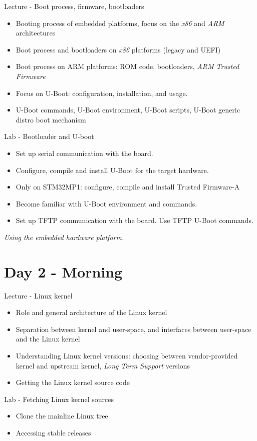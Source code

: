 \documentclass[a4paper,12pt,obeyspaces,spaces,hyphens]{article}
\begin{document}
\feagendatwocolumn
{Lecture - Boot process, firmware, bootloaders}
{
  \begin{itemize}
  \item Booting process of embedded platforms, focus on the {\em x86}
    and {\em ARM} architectures
  \item Boot process and bootloaders on {\em x86} platforms (legacy
    and UEFI)
  \item Boot process on ARM platforms: ROM code, bootloaders, {\em ARM
      Trusted Firmware}
  \item Focus on U-Boot: configuration, installation, and usage.
  \item U-Boot commands, U-Boot environment, U-Boot scripts, U-Boot
    generic distro boot mechanism
  \end{itemize}
}
{Lab - Bootloader and U-boot}
{
  \begin{itemize}
  \item Set up serial communication with the board.
  \item Configure, compile and install U-Boot for the target hardware.
  \item Only on STM32MP1: configure, compile and install Trusted Firmware-A
  \item Become familiar with U-Boot environment and commands.
  \item Set up TFTP communication with the board. Use TFTP U-Boot
    commands.
  \end{itemize}

  \vspace{0.5cm}
  {\em Using the embedded hardware platform.}
}

\section{Day 2 - Morning}

\feagendatwocolumn
{Lecture - Linux kernel}
{
  \begin{itemize}
  \item Role and general architecture of the Linux kernel
  \item Separation between kernel and user-space, and interfaces
    between user-space and the Linux kernel
  \item Understanding Linux kernel versions: choosing between
    vendor-provided kernel and upstream kernel, {\em Long Term
      Support} versions
  \item Getting the Linux kernel source code
  \end{itemize}
}
{Lab - Fetching Linux kernel sources}
{
  \begin{itemize}
  \item Clone the mainline Linux tree
  \item Accessing stable releases
  \end{itemize}
}
\end{document}
